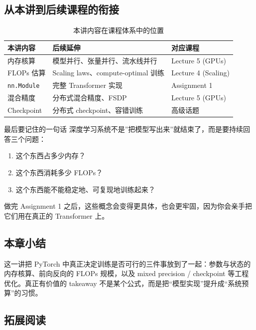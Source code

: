\documentclass[a4paper]{article}
\begin{document}
\subsection{从本讲到后续课程的衔接}

\begin{table}[H]
\centering
\begin{tabular}{p{}p{}p{}}
\toprule
\textbf{本讲内容} & \textbf{后续延伸} & \textbf{对应课程} \\
\midrule
内存核算 & 模型并行、张量并行、流水线并行 & Lecture 5 (GPUs) \\
FLOPs 估算 & Scaling laws、compute-optimal 训练 & Lecture 4 (Scaling) \\
\texttt{nn.Module} & 完整 Transformer 实现 & Assignment 1 \\
混合精度 & 分布式混合精度、FSDP & Lecture 5 (GPUs) \\
Checkpoint & 分布式 checkpoint、容错训练 & 高级话题 \\
\bottomrule
\end{tabular}
\caption{本讲内容在课程体系中的位置}
\end{table}

\begin{importantbox}{最后要记住的一句话}
深度学习系统不是”把模型写出来”就结束了，而是要持续回答三个问题：
\begin{enumerate}
    \item 这个东西占多少内存？
    \item 这个东西消耗多少 FLOPs？
    \item 这个东西能不能稳定地、可复现地训练起来？
\end{enumerate}
\end{importantbox}

做完 Assignment 1 之后，这些概念会变得更具体，也会更牢固，因为你会亲手把它们用在真正的 Transformer 上。

\subsection{本章小结}
这一讲把 PyTorch 中真正决定训练是否可行的三件事放到了一起：参数与状态的内存核算、前向反向的 FLOPs 规模，以及 mixed precision / checkpoint 等工程优化。真正有价值的 takeaway 不是某个公式，而是把“模型实现”提升成“系统预算”的习惯。

\subsection{拓展阅读}
\end{document}
